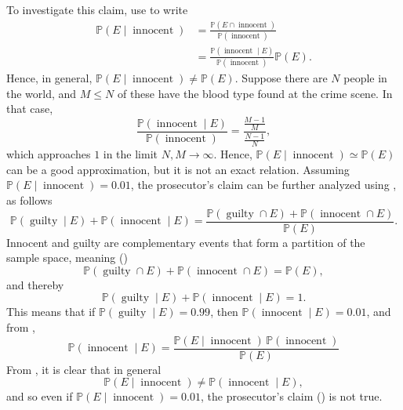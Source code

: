 \begin{example}
	To investigate this claim, use  to write
	\begin{equation}
		\begin{split}
			\mathbb{P}(E \mid \operatorname{innocent}) &= \frac{\mathbb{P}(E \cap \operatorname{innocent})}{\mathbb{P}(\operatorname{innocent})} \\
			&= \frac{\mathbb{P}(\operatorname{innocent} \mid E)}{\mathbb{P}(\operatorname{innocent})} \mathbb{P}(E).
		\end{split}
	\end{equation}
	Hence, in general, $\mathbb{P}(E \mid \operatorname{innocent}) \neq \mathbb{P}(E)$. Suppose there are $N$ people in the world, and $M \leq N$ of these have the blood type found at the crime scene. In that case,
	\begin{equation}
		\frac{\mathbb{P}(\operatorname{innocent} \mid E)}{\mathbb{P}(\operatorname{innocent})} = \frac{\frac{M-1}{M}}{\frac{N-1}{N}},
	\end{equation}
	which approaches $1$ in the limit $N,M \rightarrow \infty$. Hence, $\mathbb{P}(E \mid \operatorname{innocent}) \simeq \mathbb{P}(E)$ can be a good approximation, but it is not an exact relation.\newline 
	Assuming $\mathbb{P}(E \mid \operatorname{innocent}) = 0.01$, the prosecutor's claim can be further analyzed using , as follows
	\begin{equation}
		\mathbb{P}(\operatorname{guilty} \mid E) + \mathbb{P}(\operatorname{innocent} \mid E) = \frac{\mathbb{P}(\operatorname{guilty} \cap E) + \mathbb{P}(\operatorname{innocent} \cap E)}{\mathbb{P}(E)}.
	\end{equation}
	Innocent and guilty are complementary events that form a partition of the sample space, meaning ()
	\begin{equation}
		\mathbb{P}(\operatorname{guilty} \cap E) + \mathbb{P}(\operatorname{innocent} \cap E) = \mathbb{P}(E),
	\end{equation}
	and thereby
	\begin{equation}
		\mathbb{P}(\operatorname{guilty} \mid E) + \mathbb{P}(\operatorname{innocent} \mid E) = 1.
	\end{equation}
	This means that if $\mathbb{P}(\operatorname{guilty} \mid E) = 0.99$, then $\mathbb{P}(\operatorname{innocent} \mid E) = 0.01$, and from ,
	\begin{equation}
			\mathbb{P}(\operatorname{innocent} \mid E) = \frac{\mathbb{P}(E \mid \operatorname{innocent}) \, \mathbb{P}(\operatorname{innocent})}{\mathbb{P}(E)}
		\label{eq:prosec}
	\end{equation}
	From , it is clear that in general
	\begin{equation}
		\mathbb{P}(E \mid \operatorname{innocent}) \neq \mathbb{P}(\operatorname{innocent} \mid E),
	\end{equation}
	and so even if $\mathbb{P}(E \mid \operatorname{innocent}) = 0.01$, the prosecutor's claim () is not true.
\end{example}

